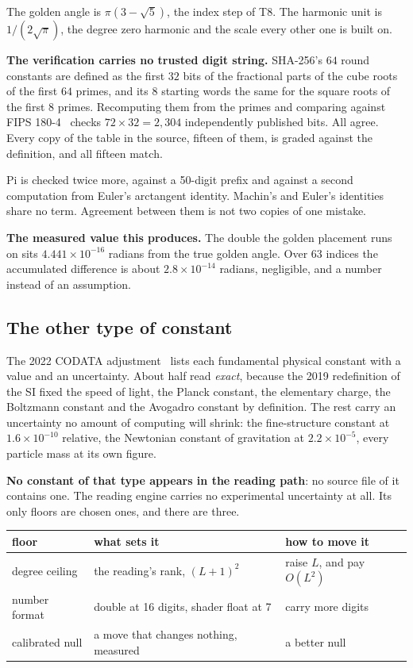 The golden angle is \(\pi(3 - \sqrt{5})\), the index step of T8. The harmonic unit is \(1/(2\sqrt{\pi})\), the degree zero harmonic and the scale every other one is built on.

\textbf{The verification carries no trusted digit string.} SHA-256's \(64\) round constants are defined as the first \(32\) bits of the fractional parts of the cube roots of the first \(64\) primes, and its \(8\) starting words the same for the square roots of the first \(8\) primes. Recomputing them from the primes and comparing against FIPS 180-4~\cite[Section~4.2.2]{src:FIPS-180-4} checks \(72 \times 32 = 2{,}304\) independently published bits. All agree. Every copy of the table in the source, fifteen of them, is graded against the definition, and all fifteen match.

Pi is checked twice more, against a 50-digit prefix and against a second computation from Euler's arctangent identity. Machin's and Euler's identities share no term. Agreement between them is not two copies of one mistake.

\textbf{The measured value this produces.} The double the golden placement runs on sits \(4.441 \times 10^{-16}\) radians from the true golden angle. Over \(63\) indices the accumulated difference is about \(2.8 \times 10^{-14}\) radians, negligible, and a number instead of an assumption.

\subsection{The other type of constant}

The 2022 CODATA adjustment~\cite[Table~XXXII]{src:Mohr-et-al-2025} lists each fundamental physical constant with a value and an uncertainty. About half read \emph{exact}, because the 2019 redefinition of the SI fixed the speed of light, the Planck constant, the elementary charge, the Boltzmann constant and the Avogadro constant by definition. The rest carry an uncertainty no amount of computing will shrink: the fine-structure constant at \(1.6 \times 10^{-10}\) relative, the Newtonian constant of gravitation at \(2.2 \times 10^{-5}\), every particle mass at its own figure.

\textbf{No constant of that type appears in the reading path}: no source file of it contains one. The reading engine carries no experimental uncertainty at all. Its only floors are chosen ones, and there are three.

\begin{center}
\begin{tabular}{@{}lll@{}}
\toprule
floor & what sets it & how to move it \\
\midrule
degree ceiling & the reading's rank, \((L+1)^2\) & raise \(L\), and pay \(O(L^2)\) \\
number format & double at 16 digits, shader float at 7 & carry more digits \\
calibrated null & a move that changes nothing, measured & a better null \\
\bottomrule
\end{tabular}
\end{center}

